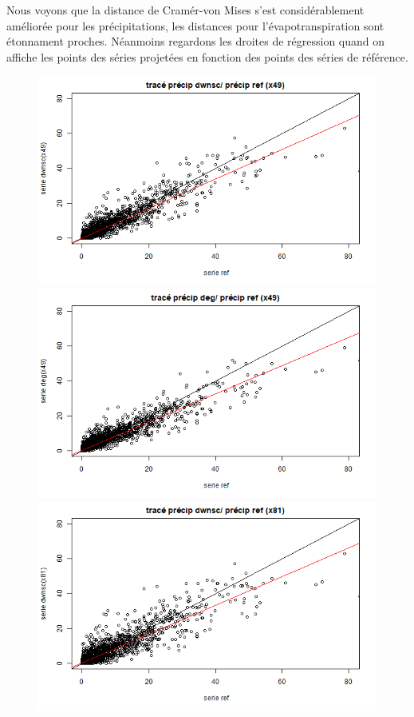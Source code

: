 \documentclass[a4paper,11pt]{article}
\numberwithin{equation}{section}
\begin{document}
Nous voyons que la distance de Cramér-von Mises s'est considérablement améliorée pour les précipitations, les distances pour l'évapotranspiration sont étonnament proches. Néanmoins regardons les droites de régression quand on affiche les points des séries projetées en fonction des points des séries de référence. 

\begin{figure}[H]
	\begin{minipage}[b]{0.4\linewidth}
		\centering \includegraphics[scale=0.4]{images/pr_3_QQ_ref.png}
	\end{minipage}\hfill
	\begin{minipage}[b]{0.4\linewidth}	
		\centering \includegraphics[scale=0.4]{images/pr_3_dg.png}
	\end{minipage}
	\begin{minipage}[b]{0.4\linewidth}
		\centering \includegraphics[scale=0.4]{images/pr_4_QQ_ref.png}

\end{minipage}
\end{figure}
\end{document}
